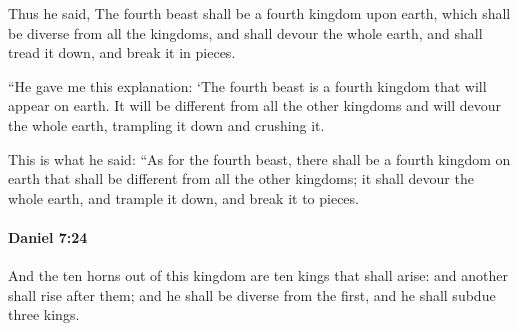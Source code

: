 			\begin{versebox}
					\item[BHS] 
					\item[LXX] 
					\item[ASV] Thus he said, The fourth beast shall be a fourth kingdom upon earth, which shall be diverse from all the kingdoms, and shall devour the whole earth, and shall tread it down, and break it in pieces.
					\item[NIV] “He gave me this explanation: ‘The fourth beast is a fourth kingdom that will appear on earth. It will be different from all the other kingdoms and will devour the whole earth, trampling it down and crushing it.
					\item[NRSV] This is what he said: “As for the fourth beast, there shall be a fourth kingdom on earth that shall be different from all the other kingdoms; it shall devour the whole earth, and trample it down, and break it to pieces.
			\end{versebox}

		\paragraph{Daniel 7:24} %
			\label{DANIEL-7-24}

			And the ten horns out of this kingdom are ten kings that shall arise: and another shall rise after them; and he shall be diverse from the first, and he shall subdue three kings.


